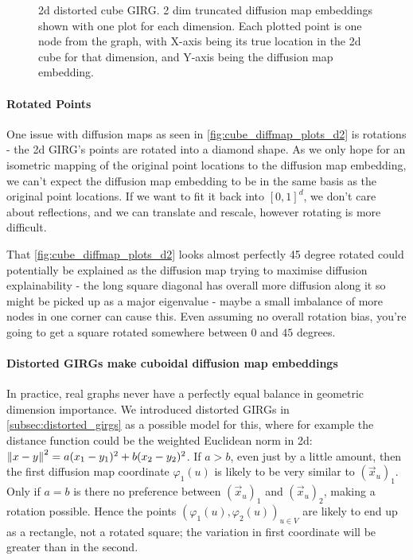 \begin{figure}
  \caption{2d distorted cube GIRG. 2 dim truncated diffusion map embeddings shown with one plot for each dimension. Each plotted point is one node from the graph, with X-axis being its true location in the 2d cube for that dimension, and Y-axis being the diffusion map embedding.}
  \label{fig:2d_distorted_major_minor}
\end{figure}


\paragraph{Rotated Points} One issue with diffusion maps as seen in \cref{fig:cube_diffmap_plots_d2} is rotations - the 2d GIRG's points are rotated into a diamond shape. As we only hope for an isometric mapping of the original point locations to the diffusion map embedding, we can't expect the diffusion map embedding to be in the same basis as the original point locations. If we want to fit it back into $[0, 1]^d$, we don't care about reflections, and we can translate and rescale, however rotating is more difficult.

That \cref{fig:cube_diffmap_plots_d2} looks almost perfectly 45 degree rotated could potentially be explained as the diffusion map trying to maximise diffusion explainability - the long square diagonal has overall more diffusion along it so might be picked up as a major eigenvalue - maybe a small imbalance of more nodes in one corner can cause this. Even assuming no overall rotation bias, you're going to get a square rotated somewhere between $0$ and $45$ degrees.

\paragraph{Distorted GIRGs make cuboidal diffusion map embeddings} In practice, real graphs never have a perfectly equal balance in geometric dimension importance. 
We introduced distorted GIRGs in \cref{subsec:distorted_girgs} as a possible model for this, where for example the distance function could be the weighted Euclidean norm in 2d: $\left\lVert x - y\right\rVert^2 = a (x_1 - y_1)^2 + b(x_2 - y_2)^2$. If $a > b$, even just by a little amount, then the first diffusion map coordinate $\varphi_1(u)$ is likely to be very similar to $(\vec{x}_u)_1$. Only if $a=b$ is there no preference between $(\vec{x}_u)_1$ and $(\vec{x}_u)_2$, making a rotation possible.
Hence the points $(\varphi_1(u), \varphi_2(u))_{u \in V}$ are likely to end up as a rectangle, not a rotated square; the variation in first coordinate will be greater than in the second.


